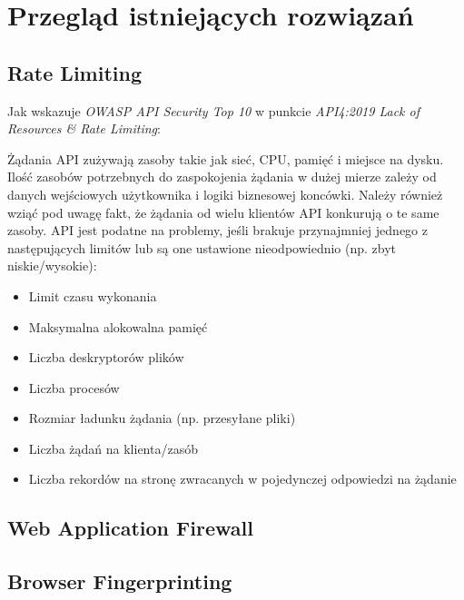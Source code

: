 \newpage


\section{Przegląd istniejących rozwiązań}\label{sec:przeglad-rozwiazan}

\subsection{Rate Limiting}\label{subsec:rate-limiting}

Jak wskazuje \emph{OWASP API Security Top 10} w punkcie \emph{API4:2019 Lack of Resources \& Rate Limiting}:
\begin{displayquote}
    Żądania API zużywają zasoby takie jak sieć, CPU, pamięć i miejsce na dysku.
    Ilość zasobów potrzebnych do zaspokojenia żądania w dużej mierze zależy od danych wejściowych użytkownika i logiki biznesowej koncówki.
    Należy również wziąć pod uwagę fakt, że żądania od wielu klientów API konkurują o te same zasoby.
    API jest podatne na problemy, jeśli brakuje przynajmniej jednego z następujących limitów lub są one ustawione nieodpowiednio (np. zbyt niskie/wysokie):

    \begin{itemize}
        \item Limit czasu wykonania
        \item Maksymalna alokowalna pamięć
        \item Liczba deskryptorów plików
        \item Liczba procesów
        \item Rozmiar ładunku żądania (np. przesyłane pliki)
        \item Liczba żądań na klienta/zasób
        \item Liczba rekordów na stronę zwracanych w pojedynczej odpowiedzi na żądanie
    \end{itemize}
\end{displayquote}

\noindent


\subsection{Web Application Firewall}\label{subsec:waf}


\subsection{Browser Fingerprinting}\label{subsec:browser-fingerprinting}

